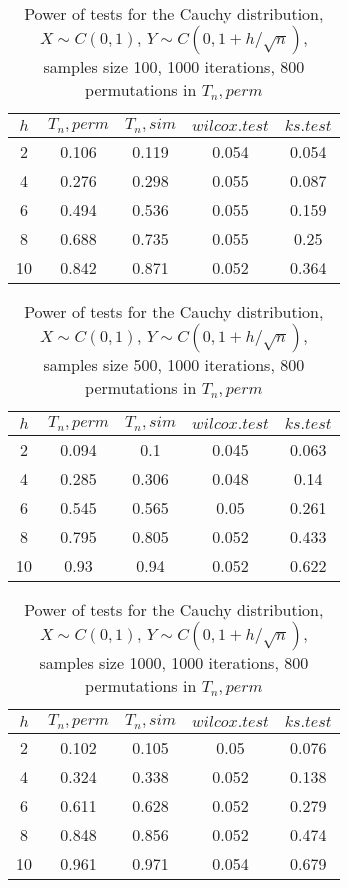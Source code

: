 \documentclass{report}
\begin{document}
\newpage

\begin{longtable}{|c|c|c|c|c|}
  \caption{Power of tests for the Cauchy distribution, \\
           $X\sim C(0,1)$, $Y\sim C(0, 1 + h/\sqrt{n})$, \\
           samples size 100, 1000 iterations, 800 permutations in $T_n, perm$} \\
  \hline
  $h$ & $T_n, perm$ & $T_n, sim$ & $wilcox.test$ & $ks.test$ \\
  \hline
  2 & 0.106 & 0.119 & 0.054 & 0.054 \\
  4 & 0.276 & 0.298 & 0.055 & 0.087 \\
  6 & 0.494 & 0.536 & 0.055 & 0.159 \\
  8 & 0.688 & 0.735 & 0.055 & 0.25 \\
  10 & 0.842 & 0.871 & 0.052 & 0.364 \\
  \hline
\end{longtable}

\begin{longtable}{|c|c|c|c|c|}
  \caption{Power of tests for the Cauchy distribution, \\
           $X\sim C(0,1)$, $Y\sim C(0, 1 + h/\sqrt{n})$, \\
           samples size 500, 1000 iterations, 800 permutations in $T_n, perm$} \\
  \hline
  $h$ & $T_n, perm$ & $T_n, sim$ & $wilcox.test$ & $ks.test$ \\
  \hline
  2 & 0.094 & 0.1 & 0.045 & 0.063 \\
  4 & 0.285 & 0.306 & 0.048 & 0.14 \\
  6 & 0.545 & 0.565 & 0.05 & 0.261 \\
  8 & 0.795 & 0.805 & 0.052 & 0.433 \\
  10 & 0.93 & 0.94 & 0.052 & 0.622 \\
  \hline
\end{longtable}

\begin{longtable}{|c|c|c|c|c|}
  \caption{Power of tests for the Cauchy distribution, \\
           $X\sim C(0,1)$, $Y\sim C(0, 1 + h/\sqrt{n})$, \\
           samples size 1000, 1000 iterations, 800 permutations in $T_n, perm$} \\
  \hline
  $h$ & $T_n, perm$ & $T_n, sim$ & $wilcox.test$ & $ks.test$ \\
  \hline
  2 & 0.102 & 0.105 & 0.05 & 0.076 \\
  4 & 0.324 & 0.338 & 0.052 & 0.138 \\
  6 & 0.611 & 0.628 & 0.052 & 0.279 \\
  8 & 0.848 & 0.856 & 0.052 & 0.474 \\
  10 & 0.961 & 0.971 & 0.054 & 0.679 \\
  \hline
\end{longtable}
\end{document}
